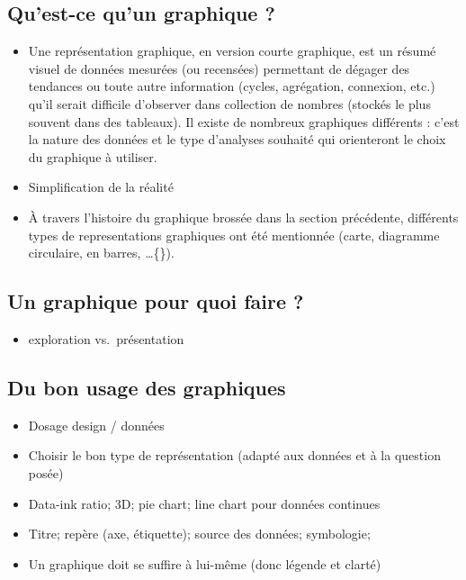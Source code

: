 \documentclass[]{article}
\providecommand{\tightlist}{%
  \setlength{\itemsep}{0pt}\setlength{\parskip}{0pt}}
\begin{document}
\hypertarget{quest-ce-quun-graphique}{%
\subsection{Qu'est-ce qu'un graphique ?}\label{quest-ce-quun-graphique}}

\begin{itemize}
\tightlist
\item
  Une représentation graphique, en version courte graphique, est un résumé visuel de données mesurées (ou recensées) permettant de dégager des tendances ou toute autre information (cycles, agrégation, connexion, etc.) qu'il serait difficile d'observer dans collection de nombres (stockés le plus souvent dans des tableaux). Il existe de nombreux graphiques différents : c'est la nature des données et le type d'analyses souhaité qui orienteront le choix du graphique à utiliser.
\item
  Simplification de la réalité
\item
  À travers l'histoire du graphique brossée dans la section précédente, différents types de representations graphiques ont été mentionnée (carte, diagramme circulaire, en barres, \ldots\{\}).
\end{itemize}

\hypertarget{un-graphique-pour-quoi-faire}{%
\subsection{Un graphique pour quoi faire ?}\label{un-graphique-pour-quoi-faire}}

\begin{itemize}
\tightlist
\item
  exploration vs.~présentation
\end{itemize}

\hypertarget{du-bon-usage-des-graphiques}{%
\subsection{Du bon usage des graphiques}\label{du-bon-usage-des-graphiques}}

\begin{itemize}
\tightlist
\item
  Dosage design / données
\item
  Choisir le bon type de représentation (adapté aux données et à la question posée)
\item
  Data-ink ratio; 3D; pie chart; line chart pour données continues
\item
  Titre; repère (axe, étiquette); source des données; symbologie;
\item
  Un graphique doit se suffire à lui-même (donc légende et clarté)
\end{itemize}
\end{document}
